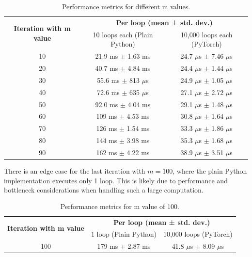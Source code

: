 \documentclass[12pt]{article}
\begin{document}
\begin{table}[ht]
    \centering
    \begin{tabular}{|c|c|c|}
        \hline
        \multirow{2}{*}{\textbf{Iteration with m value}} & \multicolumn{2}{c|}{\textbf{Per loop (mean ± std. dev.)}} \\
        \cline{2-3}
            & 10 loops each (Plain Python) & 10,000 loops each (PyTorch) \\
        \hline
        10  & 21.9 ms $\pm$ 1.63 ms  & 24.7 $\mu$s $\pm$ 7.46 $\mu$s  \\
        \hline
        20  & 40.7 ms $\pm$ 4.84 ms  & 24.4 $\mu$s $\pm$ 1.44 $\mu$s  \\
        \hline
        30  & 55.6 ms $\pm$ 813 $\mu$s  & 24.9 $\mu$s $\pm$ 1.05 $\mu$s  \\
        \hline
        40  & 72.6 ms $\pm$ 635 $\mu$s  & 27.1 $\mu$s $\pm$ 2.72 $\mu$s  \\
        \hline
        50  & 92.0 ms $\pm$ 4.04 ms  & 29.1 $\mu$s $\pm$ 1.48 $\mu$s  \\
        \hline
        60  & 109 ms $\pm$ 4.53 ms  & 30.8 $\mu$s $\pm$ 1.64 $\mu$s  \\
        \hline
        70  & 126 ms $\pm$ 1.54 ms  & 33.3 $\mu$s $\pm$ 1.86 $\mu$s  \\
        \hline
        80  & 144 ms $\pm$ 3.98 ms  & 35.3 $\mu$s $\pm$ 1.68 $\mu$s  \\
        \hline
        90  & 162 ms $\pm$ 4.22 ms  & 38.9 $\mu$s $\pm$ 3.51 $\mu$s  \\
        \hline
    \end{tabular}
    \caption{Performance metrics for different m values.}
\end{table}

\noindent There is an edge case for the last iteration with \( m = 100 \),
where the plain Python implementation executes only 1 loop.
This is likely due to performance and bottleneck considerations
when handling such a large computation.

\begin{table}[ht]
    \centering
    \begin{tabular}{|c|c|c|}
        \hline
        \multirow{2}{*}{\textbf{Iteration with m value}} & \multicolumn{2}{c|}{\textbf{Per loop (mean ± std. dev.)}} \\
        \cline{2-3}
        & 1 loop (Plain Python) & 10,000 loops (PyTorch) \\
        \hline
        100 & 179 ms $\pm$ 2.87 ms & 41.8 $\mu$s $\pm$ 8.09 $\mu$s \\
        \hline
    \end{tabular}
    \caption{Performance metrics for m value of 100.}
\end{table}
\end{document}
